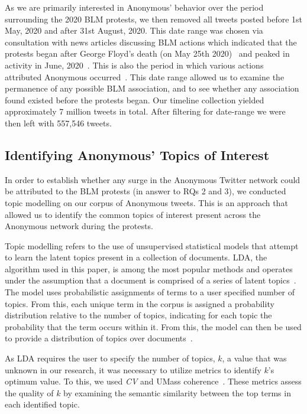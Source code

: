 \documentclass[letterpaper]{article}
\begin{document}
As we are primarily interested in Anonymous' behavior over the period surrounding the 2020 BLM protests, we then removed all tweets posted before 1st May, 2020 and after 31st August, 2020. This date range was chosen via consultation with news articles discussing BLM actions which indicated that the protests began after George Floyd's death (on May 25th 2020)~\cite{AlJazeera2020, Independant2020} and peaked in activity in June, 2020~\cite{NYT2020}. This is also the period in which various actions attributed Anonymous occurred~\cite{AJC2020}. This date range allowed us to examine the permanence of any possible BLM association, and to see whether any association found existed before the protests began. Our timeline collection yielded approximately 7 million tweets in total. After filtering for date-range we were then left with 557,546 tweets.

\subsection{Identifying Anonymous' Topics of Interest}

In order to establish whether any surge in the Anonymous Twitter network could be attributed to the BLM protests (in answer to RQs 2 and 3), we conducted topic modelling on our corpus of Anonymous tweets. This is an approach that allowed us to identify the common topics of interest present across the Anonymous network during the protests.

Topic modelling refers to the use of unsupervised statistical models that attempt to learn the latent topics present in a collection of documents. LDA, the algorithm used in this paper, is among the most popular methods and operates under the assumption that a document is comprised of a series of latent topics~\cite{Kigerl2018}. The model uses probabilistic assignments of terms to a user specified number of topics. From this, each unique term in the corpus is assigned a probability distribution relative to the number of topics, indicating for each topic the probability that the term occurs within it. From this, the model can then be used to provide a distribution of topics over documents~\cite{Kigerl2018}.

As LDA requires the user to specify the number of topics, $k$, a value that was unknown in our research, it was necessary to utilize metrics to identify $k$'s optimum value. To this, we used \textit{CV} and UMass coherence~\cite{Syed2017}. These metrics assess the quality of $k$ by examining the semantic similarity between the top terms in each identified topic.
\end{document}
